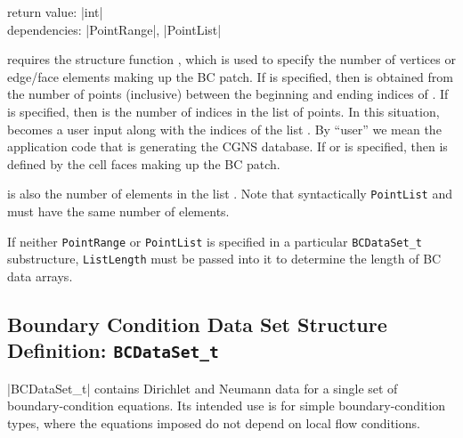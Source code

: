 \noindent return value: |int| \\
\noindent dependencies: |PointRange|, |PointList|

 requires the structure function , which
is used to specify the number of vertices or edge/face elements
making up the BC patch.  If
 is specified, then  is obtained
from the number of points (inclusive) between the beginning and ending
indices of .
If  is specified, then  is the number
of indices in the list of points.
In this situation,  becomes a user input along with the
indices of the list .
By ``user'' we mean the application code that is generating the CGNS
database.
If  or  is specified, then
 is defined by the cell faces making up the BC patch.

 is also the number of elements in the list
.
Note that syntactically \texttt{PointList} and
 must have the same number of elements.

If neither \texttt{PointRange} or \texttt{PointList} is specified in a
particular \texttt{BCDataSet\_t} substructure, \texttt{List\-Length} must
be passed into it to determine the length of BC data arrays.

\subsection{Boundary Condition Data Set Structure Definition: \texttt{BCDataSet\_t}}
\label{s:BCDataSet}

|BCDataSet_t| contains Dirichlet and Neumann data for a single set of
boundary-condition equations.
Its intended use is for simple boundary-condition types, where the
equations imposed do not depend on local flow conditions.


